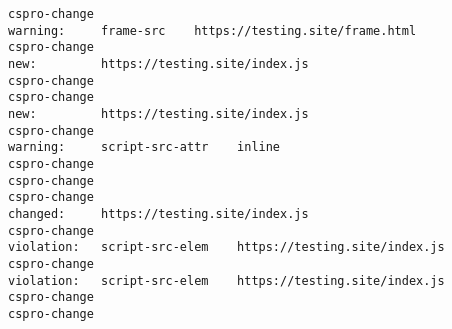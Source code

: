 \begin{verbatim}
cspro-change
warning:     frame-src    https://testing.site/frame.html
cspro-change
new:         https://testing.site/index.js
cspro-change
cspro-change
new:         https://testing.site/index.js
cspro-change
warning:     script-src-attr    inline
cspro-change
cspro-change
cspro-change
changed:     https://testing.site/index.js
cspro-change
violation:   script-src-elem    https://testing.site/index.js
cspro-change
violation:   script-src-elem    https://testing.site/index.js
cspro-change
cspro-change
\end{verbatim}

